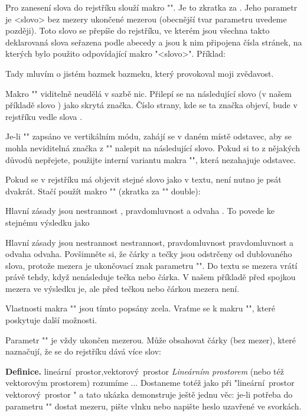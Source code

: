 Pro zanesení slova do rejstříku slouží makro "\ii". Je to zkratka za
.
Jeho parametr je <slovo> bez mezery ukončené mezerou (obecnější tvar parametru
uvedeme později). Toto slovo se přepíše do rejstříku, ve kterém jsou všechna
takto deklarovaná slova seřazena podle abecedy a jsou k nim připojena čísla
stránek, na kterých bylo použito odpovídající makro "\ii <slovo>". 
Příklad:

\begtt
Tady mluvím o jistém
\ii bazmek
bazmeku, který provokoval moji zvědavost.
\endtt

Makro "\ii" viditelně neudělá v sazbě nic. Přilepí se na následující slovo (v
našem příkladě slovo ) jako skrytá značka. Číslo strany,
kde se ta značka objeví, bude v rejstříku vedle slova .

Je-li "\ii" zapsáno ve vertikálním módu, zahájí se v daném místě odstavec,
aby se mohla neviditelná značka z "\ii" nalepit na následující slovo. Pokud
si to z nějakých důvodů nepřejete, použijte interní variantu makra
"", která nezahajuje odstavec.

Pokud se v rejstříku má objevit stejné slovo jako v textu, není nutno je psát
dvakrát. Stačí použít makro "\iid" (zkratka za "\ii" double):

\begtt
Hlavní zásady jsou \iid nestrannost , \iid pravdomluvnost a \iid odvaha .
\endtt
%
To povede ke stejnému výsledku jako

\begtt
Hlavní zásady jsou \ii nestrannost nestrannost,
\ii pravdomluvnost pravdomluvnost a \ii odvaha odvaha.
\endtt
%
Povšimněte si, že čárky a tečky jsou odstrčeny od dublovaného slova, protože
mezera je ukončovací znak parametru "\iid". Do textu se mezera vrátí právě
tehdy, když nenásleduje tečka nebo čárka. V našem příkladě před spojkou 
mezera ve výsledku je, ale před tečkou nebo čárkou mezera není.

Vlastnosti makra "\iid" jsou tímto popsány zcela. Vraťme se k makru "\ii",
které poskytuje další možnosti.

Parametr "\ii" je vždy ukončen mezerou. Může obsahovat čárky (bez mezer),
které naznačují, že se do rejstříku dává více slov:

\begtt
{\bf Definice.}
\ii lineární~prostor,vektorový~prostor
{\em Lineárním prostorem} (nebo též vektorovým prostorem) rozumíme ...
\endtt
%
Dostaneme totéž jako při "\ii lineární~prostor \ii vektorový~prostor "
a tato ukázka demonstruje ještě jednu věc: je-li potřeba do parametru "\ii"
dostat mezeru, pište vlnku nebo napište heslo uzavřené ve svorkách.

